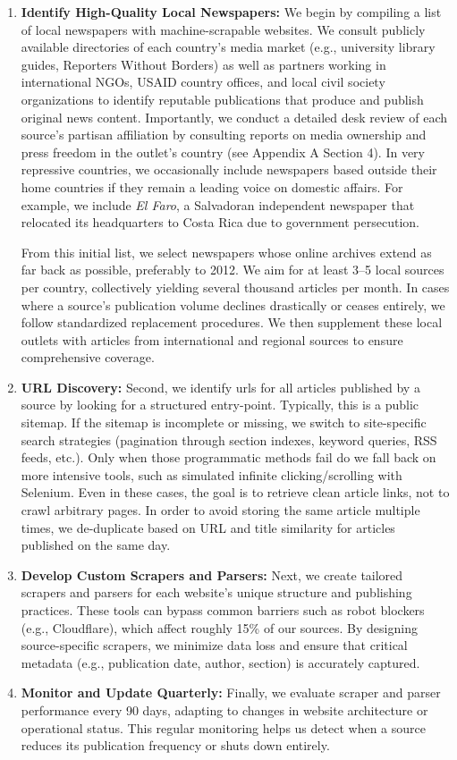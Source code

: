 \documentclass[
  letterpaper,
  DIV=11,
  numbers=noendperiod]{scrartcl}
\begin{document}
\begin{enumerate}
\def\labelenumi{\arabic{enumi}.}
\item
  \textbf{Identify High-Quality Local Newspapers:} We begin by compiling
  a list of local newspapers with machine-scrapable websites. We consult
  publicly available directories of each country's media market (e.g.,
  university library guides, Reporters Without Borders) as well as
  partners working in international NGOs, USAID country offices, and
  local civil society organizations to identify reputable publications
  that produce and publish original news content. Importantly, we
  conduct a detailed desk review of each source's partisan affiliation
  by consulting reports on media ownership and press freedom in the
  outlet's country (see Appendix A Section 4). In very repressive
  countries, we occasionally include newspapers based outside their home
  countries if they remain a leading voice on domestic affairs. For
  example, we include \emph{El Faro}, a Salvadoran independent newspaper
  that relocated its headquarters to Costa Rica due to government
  persecution.

  From this initial list, we select newspapers whose online archives
  extend as far back as possible, preferably to 2012. We aim for at
  least 3--5 local sources per country, collectively yielding several
  thousand articles per month. In cases where a source's publication
  volume declines drastically or ceases entirely, we follow standardized
  replacement procedures. We then supplement these local outlets with
  articles from international and regional sources to ensure
  comprehensive coverage.
\item
  \textbf{URL Discovery:} Second, we identify urls for all articles
  published by a source by looking for a structured entry-point.
  Typically, this is a public sitemap. If the sitemap is incomplete or
  missing, we switch to site-specific search strategies (pagination
  through section indexes, keyword queries, RSS feeds, etc.). Only when
  those programmatic methods fail do we fall back on more intensive
  tools, such as simulated infinite clicking/scrolling with Selenium.
  Even in these cases, the goal is to retrieve clean article links, not
  to crawl arbitrary pages. In order to avoid storing the same article
  multiple times, we de-duplicate based on URL and title similarity for
  articles published on the same day.
\item
  \textbf{Develop Custom Scrapers and Parsers:} Next, we create tailored
  scrapers and parsers for each website's unique structure and
  publishing practices. These tools can bypass common barriers such as
  robot blockers (e.g., Cloudflare), which affect roughly 15\% of our
  sources. By designing source-specific scrapers, we minimize data loss
  and ensure that critical metadata (e.g., publication date, author,
  section) is accurately captured.
\item
  \textbf{Monitor and Update Quarterly:} Finally, we evaluate scraper
  and parser performance every 90 days, adapting to changes in website
  architecture or operational status. This regular monitoring helps us
  detect when a source reduces its publication frequency or shuts down
  entirely.
\end{enumerate}
\end{document}

